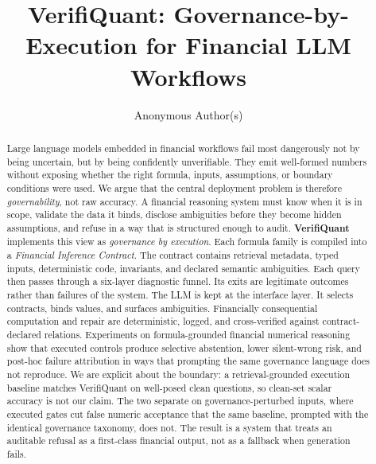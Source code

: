\title{VerifiQuant: Governance-by-Execution for Financial LLM Workflows}

\author{Anonymous Author(s)}

\begin{abstract}
Large language models embedded in financial workflows fail most dangerously not by being uncertain, but by being confidently unverifiable.
They emit well-formed numbers without exposing whether the right formula, inputs, assumptions, or boundary conditions were used.
We argue that the central deployment problem is therefore \emph{governability}, not raw accuracy.
A financial reasoning system must know when it is in scope, validate the data it binds, disclose ambiguities before they become hidden assumptions, and refuse in a way that is structured enough to audit.
\textbf{VerifiQuant} implements this view as \emph{governance by execution}.
Each formula family is compiled into a \emph{Financial Inference Contract}.
The contract contains retrieval metadata, typed inputs, deterministic code, invariants, and declared semantic ambiguities.
Each query then passes through a six-layer diagnostic funnel.
Its exits are legitimate outcomes rather than failures of the system.
The LLM is kept at the interface layer. It selects contracts, binds values, and surfaces ambiguities.
Financially consequential computation and repair are deterministic, logged, and cross-verified against contract-declared relations.
Experiments on formula-grounded financial numerical reasoning show that executed controls produce selective abstention, lower silent-wrong risk, and post-hoc failure attribution in ways that prompting the same governance language does not reproduce.
We are explicit about the boundary: a retrieval-grounded execution baseline matches VerifiQuant on well-posed clean questions, so clean-set scalar accuracy is not our claim.
The two separate on governance-perturbed inputs, where executed gates cut false numeric acceptance that the same baseline, prompted with the identical governance taxonomy, does not.
The result is a system that treats an auditable refusal as a first-class financial output, not as a fallback when generation fails.
\end{abstract}
